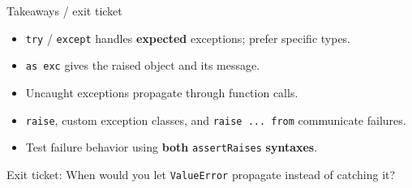 \documentclass[aspectratio=169,10pt]{beamer}
\begin{document}
\begin{frame}[fragile]{Takeaways / exit ticket}
\begin{itemize}\item \texttt{try} / \texttt{except} handles \textbf{expected} exceptions; prefer specific types.\item \texttt{as exc} gives the raised object and its message.\item Uncaught exceptions propagate through function calls.\item \texttt{raise}, custom exception classes, and \texttt{raise ... from} communicate failures.\item Test failure behavior using \textbf{both} \texttt{assertRaises} \textbf{syntaxes}.\end{itemize}
\vspace{0.06in}\begin{keyidea}\small Exit ticket: When would you let \texttt{ValueError} propagate instead of catching it?\end{keyidea}
\end{frame}
\end{document}
